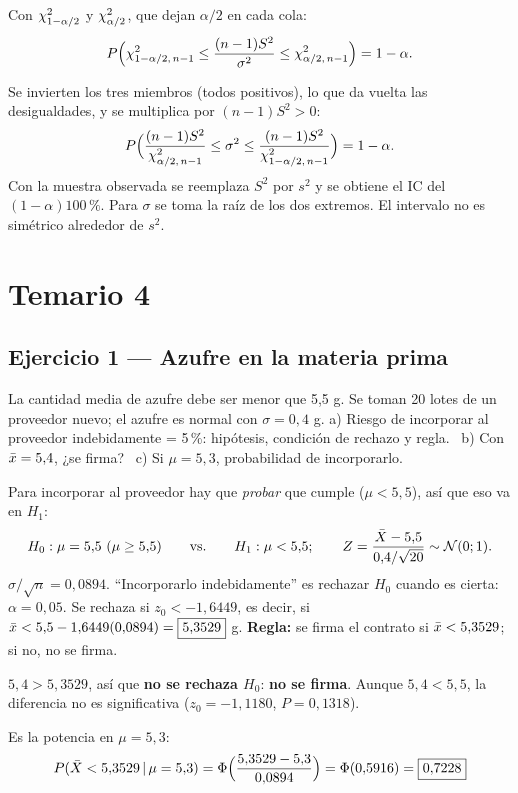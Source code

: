  Con $\chi^2_{1-\alpha/2}$ y $\chi^2_{\alpha/2}$, que dejan $\alpha/2$ en cada cola:
\[
P\Big(\chi^2_{1-\alpha/2,\,n-1}\le\frac{(n-1)S^2}{\sigma^2}\le\chi^2_{\alpha/2,\,n-1}\Big)=1-\alpha.
\]

 Se invierten los tres miembros (todos positivos), lo que da vuelta las desigualdades, y se multiplica por $(n-1)S^2>0$:
\[
P\Big(\frac{(n-1)S^2}{\chi^2_{\alpha/2,\,n-1}}\le\sigma^2\le\frac{(n-1)S^2}{\chi^2_{1-\alpha/2,\,n-1}}\Big)=1-\alpha.
\]
 Con la muestra observada se reemplaza $S^2$ por $s^2$ y se obtiene el IC del $(1-\alpha)100\,\%$. Para $\sigma$ se toma la raíz de los dos extremos. El intervalo no es simétrico alrededor de $s^2$.

\newpage
\section{Temario 4}

\subsection{Ejercicio 1 --- Azufre en la materia prima}
\begin{enun}
La cantidad media de azufre debe ser menor que 5,5 g. Se toman 20 lotes de un proveedor nuevo; el azufre es normal con $\sigma=0{,}4$ g.
a) Riesgo de incorporar al proveedor indebidamente = 5\,\%: hipótesis, condición de rechazo y regla. \ b) Con $\bar{x}=5{,}4$, ¿se firma? \ c) Si $\mu=5{,}3$, probabilidad de incorporarlo.
\end{enun}
Para incorporar al proveedor hay que \emph{probar} que cumple ($\mu<5{,}5$), así que eso va en $H_1$:
\[
H_0:\mu=5{,}5\ (\mu\ge5{,}5)\qquad\text{vs.}\qquad H_1:\mu<5{,}5;\qquad Z=\frac{\Xb-5{,}5}{0{,}4/\sqrt{20}}\sim\Nor(0;1).
\]
$\sigma/\sqrt n=0{,}0894$. ``Incorporarlo indebidamente'' es rechazar $H_0$ cuando es cierta: $\alpha=0{,}05$. Se rechaza si $z_0<-1{,}6449$, es decir, si $\bar{x}<5{,}5-1{,}6449(0{,}0894)=\boxed{5{,}3529}$ g.
\textbf{Regla:} se firma el contrato si $\bar{x}<5{,}3529$; si no, no se firma.

$5{,}4>5{,}3529$, así que \textbf{no se rechaza $H_0$}: \textbf{no se firma}. Aunque $5{,}4<5{,}5$, la diferencia no es significativa ($z_0=-1{,}1180$, $P=0{,}1318$).

Es la potencia en $\mu=5{,}3$:
\[
P(\bar{X}<5{,}3529\,|\,\mu=5{,}3)=\Phi\Big(\frac{5{,}3529-5{,}3}{0{,}0894}\Big)=\Phi(0{,}5916)=\boxed{0{,}7228}
\]

